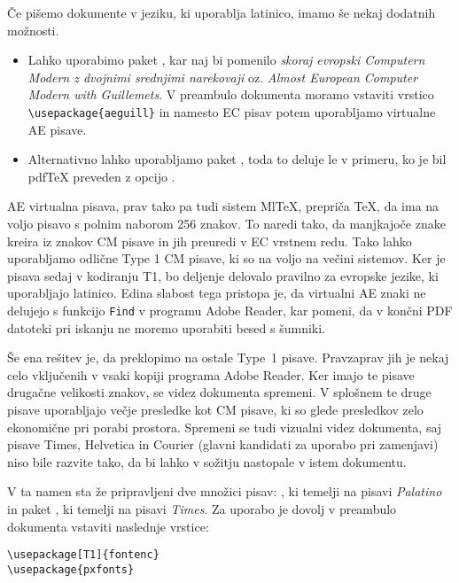 Če pišemo dokumente v jeziku, ki uporablja latinico, imamo še nekaj
dodatnih možnosti. 
\begin{itemize}
\item Lahko uporabimo paket , kar naj bi pomenilo
  \emph{skoraj evropski Computern Modern z dvojnimi srednjimi narekovaji} oz. 
  \emph{Almost European Computer Modern with Guillemets}. V preambulo 
  dokumenta moramo vstaviti 
  vrstico \verb+\usepackage{aeguill}+  in namesto
  EC pisav potem uporabljamo virtualne AE pisave.
\item Alternativno lahko uporabljamo paket , toda to deluje
 le v primeru, ko je bil pdf\TeX{} preveden z opcijo .
\end{itemize}
AE virtualna pisava, prav tako pa tudi sistem {Ml\TeX}, prepriča \TeX{}, 
da ima na voljo pisavo s polnim naborom 256 znakov. To naredi tako,
da manjkajoče znake kreira iz znakov CM pisave in jih preuredi v EC vrstnem
redu. Tako lahko uporabljamo odlične Type 1 CM pisave, ki so na voljo na večini
sistemov. Ker je pisava sedaj v kodiranju T1, bo deljenje delovalo pravilno za
evropske jezike, ki uporabljajo latinico. Edina slabost tega pristopa je, 
da virtualni AE znaki ne delujejo s funkcijo \texttt{Find} v programu
Adobe Reader, kar pomeni, da v končni PDF datoteki pri iskanju ne moremo uporabiti besed s šumniki. 


Še ena rešitev je, da preklopimo na ostale 
\PSi{} Type~1 pisave. Pravzaprav jih je nekaj celo vključenih v vsaki
kopiji programa Adobe Reader. Ker imajo te pisave 
drugačne velikosti znakov, se videz dokumenta spremeni. V splošnem 
te druge pisave uporabljajo večje presledke kot CM pisave, ki so glede
presledkov zelo ekonomične pri porabi prostora. Spremeni se tudi vizualni
videz dokumenta, saj pisave Times, Helvetica in
Courier (glavni kandidati za uporabo pri zamenjavi) niso bile
razvite tako, da bi lahko v sožitju nastopale v istem dokumentu.

V ta namen sta že pripravljeni dve množici pisav:
, ki temelji na pisavi \emph{Palatino} in paket
, ki temelji na pisavi \emph{Times}. Za uporabo je dovolj v 
preambulo dokumenta vstaviti naslednje vrstice:
\begin{code}
\begin{verbatim}
\usepackage[T1]{fontenc}
\usepackage{pxfonts}
\end{verbatim}
\end{code}

